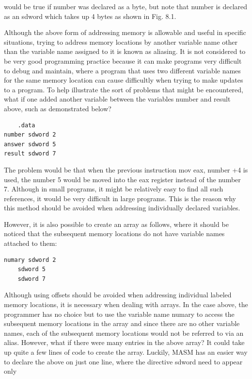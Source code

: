 \documentclass[10pt]{book}
\begin{document}
would be true if number was declared as a byte, but note that number is declared as an sdword which takes up 4 bytes as shown in Fig. 8.1.

Although the above form of addressing memory is allowable and useful in specific situations, trying to address memory locations by another variable name other than the variable name assigned to it is known as aliasing. It is not considered to be very good programming practice because it can make programs very difficult to debug and maintain, where a program that uses two different variable names for the same memory location can cause difficultly when trying to make updates to a program. To help illustrate the sort of problems that might be encountered, what if one added another variable between the variables number and result above, such as demonstrated below?

\begin{verbatim}
    .data
number sdword 2
answer sdword 5
result sdword 7
\end{verbatim}

The problem would be that when the previous instruction mov eax, number +4 is used, the number 5 would be moved into the eax register instead of the number 7. Although in small programs, it might be relatively easy to find all such references, it would be very difficult in large programs. This is the reason why this method should be avoided when addressing individually declared variables.

However, it is also possible to create an array as follows, where it should be noticed that the subsequent memory locations do not have variable names attached to them:

\begin{verbatim}
numary sdword 2
    sdword 5
    sdword 7
\end{verbatim}

Although using offsets should be avoided when addressing individual labeled memory locations, it is necessary when dealing with arrays. In the case above, the programmer has no choice but to use the variable name numary to access the subsequent memory locations in the array and since there are no other variable names, each of the subsequent memory locations would not be referred to via an alias. However, what if there were many entries in the above array? It could take up quite a few lines of code to create the array. Luckily, MASM has an easier way to declare the above on just one line, where the directive sdword need to appear only
\end{document}
